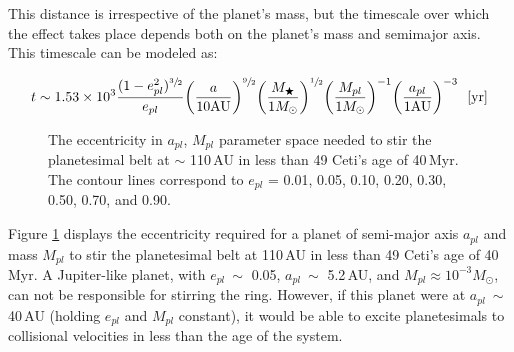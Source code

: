 This distance is irrespective of the planet's mass, but the timescale over which the effect takes place depends both on the planet's mass and semimajor axis. This timescale can be modeled as:

\begin{equation}
\label{eq:planetExciteTime}
t \sim 1.53 \times 10^{3} \frac{(1-e_{pl}^{2})^{\sfrac{3}{2}}}{e_{pl}}\bigg(\frac{a}{10\text{AU}}\bigg)^{\sfrac{9}{2}} \bigg(\frac{M_{\bigstar}}{1M_{\odot}}\bigg)^{\sfrac{1}{2}} \bigg(\frac{M_{pl}}{1M_{\odot}}\bigg)^{-1} \bigg(\frac{a_{pl}}{1\text{AU}}\bigg)^{-3}~~[\text{yr}]
\end{equation}

\begin{figure}
	\caption{The eccentricity in $a_{pl}$, $M_{pl}$ parameter space needed to stir the planetesimal belt at $\sim$ 110\,AU in less than 49 Ceti's age of 40\,Myr. The contour lines correspond to $e_{pl}$ = 0.01, 0.05, 0.10, 0.20, 0.30, 0.50, 0.70, and 0.90.}
	\label{fig:49CET_StirringPlot}
\end{figure}


Figure \ref{fig:49CET_StirringPlot} displays the eccentricity required for a planet of semi-major axis $a_{pl}$ and mass $M_{pl}$ to stir the planetesimal belt at 110\,AU in less than 49 Ceti's age of 40\,Myr. A Jupiter-like planet, with $e_{pl}~\sim$ 0.05, $a_{pl}~\sim$ 5.2\,AU, and $M_{pl} \approx 10^{-3} M_{\odot}$, can not be responsible for stirring the ring. However, if this planet were at $a_{pl}~\sim$ 40\,AU (holding $e_{pl}$ and $M_{pl}$ constant), it would be able to excite planetesimals to collisional velocities in less than the age of the system. 


